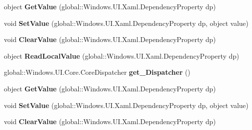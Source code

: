 \begin{DoxyCompactItemize}
object {\bfseries Get\+Value} (global\+::\+Windows.\+U\+I.\+Xaml.\+Dependency\+Property dp)
\item 
\mbox{\label{interface_windows_1_1_u_i_1_1_xaml_1_1_i_dependency_object_a7174b4128f6df875a6cd6f3b979105da}} 
void {\bfseries Set\+Value} (global\+::\+Windows.\+U\+I.\+Xaml.\+Dependency\+Property dp, object value)
\item 
\mbox{\label{interface_windows_1_1_u_i_1_1_xaml_1_1_i_dependency_object_a1169e582ab655b744276f5fc85131e33}} 
void {\bfseries Clear\+Value} (global\+::\+Windows.\+U\+I.\+Xaml.\+Dependency\+Property dp)
\item 
\mbox{\label{interface_windows_1_1_u_i_1_1_xaml_1_1_i_dependency_object_ac164cdf8cd074ee7873c1b78067c67a9}} 
object {\bfseries Read\+Local\+Value} (global\+::\+Windows.\+U\+I.\+Xaml.\+Dependency\+Property dp)
\item 
\mbox{\label{interface_windows_1_1_u_i_1_1_xaml_1_1_i_dependency_object_ab52f7609e07a50a387cb3677a4d0304f}} 
global\+::\+Windows.\+U\+I.\+Core.\+Core\+Dispatcher {\bfseries get\+\_\+\+Dispatcher} ()
\item 
\mbox{\label{interface_windows_1_1_u_i_1_1_xaml_1_1_i_dependency_object_a1744dc503c3fc269bb45b8db06275e99}} 
object {\bfseries Get\+Value} (global\+::\+Windows.\+U\+I.\+Xaml.\+Dependency\+Property dp)
\item 
\mbox{\label{interface_windows_1_1_u_i_1_1_xaml_1_1_i_dependency_object_a7174b4128f6df875a6cd6f3b979105da}} 
void {\bfseries Set\+Value} (global\+::\+Windows.\+U\+I.\+Xaml.\+Dependency\+Property dp, object value)
\item 
\mbox{\label{interface_windows_1_1_u_i_1_1_xaml_1_1_i_dependency_object_a1169e582ab655b744276f5fc85131e33}} 
void {\bfseries Clear\+Value} (global\+::\+Windows.\+U\+I.\+Xaml.\+Dependency\+Property dp)

\end{DoxyCompactItemize}
